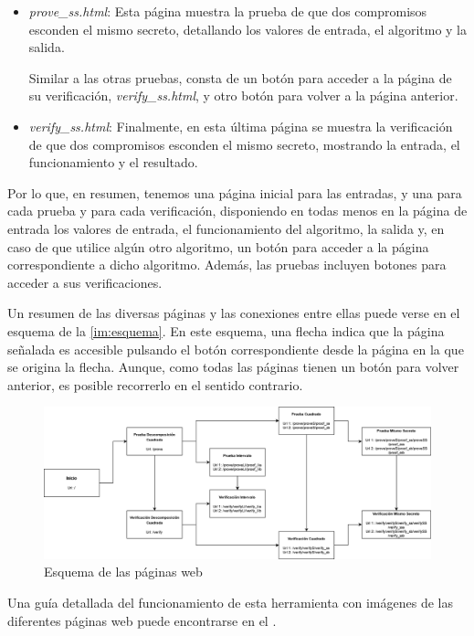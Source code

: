\begin{itemize}
    \item \emph{prove\_ss.html}: Esta página muestra la prueba de que dos compromisos esconden el mismo secreto, detallando los valores de entrada, el algoritmo y la salida.

    Similar a las otras pruebas, consta de un botón para acceder a la página de su verificación, \emph{verify\_ss.html}, y otro botón para volver a la página anterior.

    \item \emph{verify\_ss.html}: Finalmente, en esta última página se muestra la verificación de que dos compromisos esconden el mismo secreto, mostrando la entrada, el funcionamiento y el resultado.
\end{itemize}

Por lo que, en resumen, tenemos una página inicial para las entradas, y una para cada prueba y para cada verificación, disponiendo en todas menos en la página de entrada los valores de entrada, el funcionamiento del algoritmo, la salida y, en caso de que utilice algún otro algoritmo, un botón para acceder a la página correspondiente a dicho algoritmo. Además, las pruebas incluyen botones para acceder a sus verificaciones.

Un resumen de las diversas páginas y las conexiones entre ellas puede verse en el esquema de la \autoref{im:esquema}. En este esquema, una flecha indica que la página señalada es accesible pulsando el botón correspondiente desde la página en la que se origina la flecha. Aunque, como todas las páginas tienen un botón para volver anterior, es posible recorrerlo en el sentido contrario.
\begin{figure}
    \centering
    \includegraphics[width=\columnwidth]{images/Esquema.png}
    \caption{Esquema de las páginas web}
    \label{im:esquema}
\end{figure}

Una guía detallada del funcionamiento de esta herramienta con imágenes de las diferentes páginas web puede encontrarse en el .

